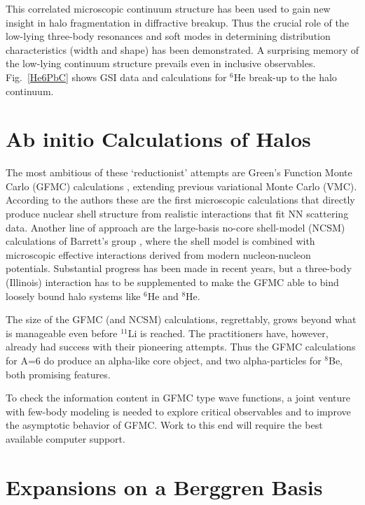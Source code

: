 This correlated microscopic continuum structure has been used to
gain new insight in halo fragmentation in diffractive breakup.
Thus the crucial role of the low-lying three-body resonances and
soft modes in determining distribution characteristics (width and
shape) has been demonstrated. A surprising memory of the low-lying
continuum structure prevails even in inclusive observables.
Fig.~\ref{He6PbC} shows GSI data and calculations \cite{ershov1} for
$^6$He break-up to the halo continuum.

\section{Ab initio Calculations of Halos}

The most ambitious of these `reductionist' attempts are Green's
Function Monte Carlo (GFMC) calculations \cite{pudl}, extending
previous variational Monte Carlo (VMC). According to the authors
these are the first microscopic calculations that directly
produce nuclear  shell structure from realistic interactions that
fit NN scattering data. Another line of approach are the
large-basis no-core shell-model (NCSM) calculations of Barrett's
group \cite{bruce1,bruce2,bruce3,bruce4}, where the shell model is combined with
microscopic effective interactions derived from modern
nucleon-nucleon potentials. Substantial progress has been made in
recent years, but a three-body (Illinois) interaction has to be
supplemented to make the  GFMC able to bind loosely bound halo
systems like $^6$He and $^8$He.

The size of the GFMC (and NCSM) calculations, regrettably, grows
beyond what is manageable even before $^{11}$Li is reached. The
practitioners have, however, already had success with their
pioneering attempts. Thus the GFMC calculations for A=6 do produce
an alpha-like core object, and two alpha-particles for $^8$Be,
both promising features.

To check the information content in GFMC type wave functions, a
joint venture with few-body modeling is needed to explore critical
observables and to improve the asymptotic behavior of GFMC. Work
to this end will require the best available computer support.

\section{Expansions on a Berggren Basis}

